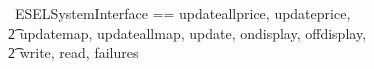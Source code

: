 \begin{circus}
   \circchannelset\ ESELSystemInterface == \lchanset updateallprice, updateprice, \\
    \t2 updatemap, updateallmap, update, ondisplay, offdisplay, \\
    \t2 write, read, failures \rchanset \\
\end{circus}
